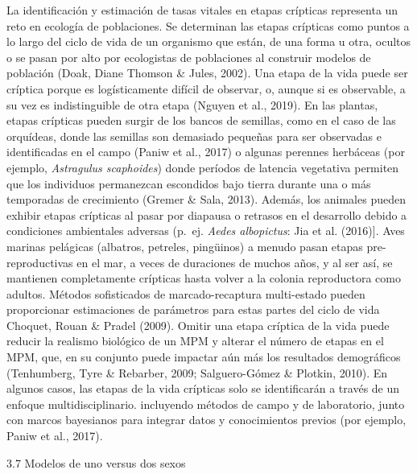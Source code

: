 \documentclass[
  12pt,
  letterpaper,
]{book}
\begin{document}
La identificación y estimación de tasas vitales en etapas crípticas
representa un reto en ecología de poblaciones. Se determinan las etapas
crípticas como puntos a lo largo del ciclo de vida de un organismo que
están, de una forma u otra, ocultos o se pasan por alto por ecologistas
de poblaciones al construir modelos de población (Doak, Diane Thomson \&
Jules, 2002). Una etapa de la vida puede ser críptica porque es
logísticamente difícil de observar, o, aunque si es observable, a su vez
es indistinguible de otra etapa (Nguyen et al., 2019). En las plantas,
etapas crípticas pueden surgir de los bancos de semillas, como en el
caso de las orquídeas, donde las semillas son demasiado pequeñas para
ser observadas e identificadas en el campo (Paniw et al., 2017) o
algunas perennes herbáceas (por ejemplo, \emph{Astragulus scaphoides})
donde períodos de latencia vegetativa permiten que los individuos
permanezcan escondidos bajo tierra durante una o más temporadas de
crecimiento (Gremer \& Sala, 2013). Además, los animales pueden exhibir
etapas crípticas al pasar por diapausa o retrasos en el desarrollo
debido a condiciones ambientales adversas (p.~ej. \emph{Aedes
albopictus}: Jia et al. (2016){]}. Aves marinas pelágicas (albatros,
petreles, pingüinos) a menudo pasan etapas pre-reproductivas en el mar,
a veces de duraciones de muchos años, y al ser así, se mantienen
completamente crípticas hasta volver a la colonia reproductora como
adultos. Métodos sofisticados de marcado-recaptura multi-estado pueden
proporcionar estimaciones de parámetros para estas partes del ciclo de
vida Choquet, Rouan \& Pradel (2009). Omitir una etapa críptica de la
vida puede reducir la realismo biológico de un MPM y alterar el número
de etapas en el MPM, que, en su conjunto puede impactar aún más los
resultados demográficos (Tenhumberg, Tyre \& Rebarber, 2009;
Salguero-Gómez \& Plotkin, 2010). En algunos casos, las etapas de la
vida crípticas solo se identificarán a través de un enfoque
multidisciplinario. incluyendo métodos de campo y de laboratorio, junto
con marcos bayesianos para integrar datos y conocimientos previos (por
ejemplo, Paniw et al., 2017).

3.7 \textbar{} Modelos de uno versus dos sexos
\end{document}
